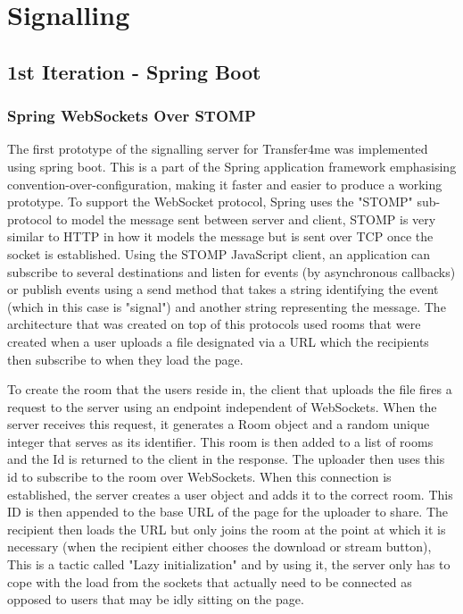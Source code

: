 \documentclass[]{report}
\begin{document}
		\section{Signalling}
			\subsection{1st Iteration - Spring Boot}
				\subsubsection*{Spring WebSockets Over STOMP}
				The first prototype of the signalling server for Transfer4me was implemented using spring boot. This is a part of the Spring application framework emphasising convention-over-configuration, making it faster and easier to produce a working prototype. To support the WebSocket protocol, Spring uses the "STOMP" sub-protocol to model the message sent between server and client, STOMP is very similar to HTTP in how it models the message but is sent over TCP once the socket is established. Using the STOMP JavaScript client, an application can subscribe to several destinations and listen for events (by asynchronous callbacks) or publish events using a send method that takes a string identifying the event (which in this case is "signal") and another string representing the message. The architecture that was created on top of this protocols used rooms that were created when a user uploads a file designated via a URL which the recipients then subscribe to when they load the page.

				To create the room that the users reside in, the client that uploads the file fires a request to the server using an endpoint independent of WebSockets. When the server receives this request, it generates a Room object and a random unique integer that serves as its identifier. This room is then added to a list of rooms and the Id is returned to the client in the response. The uploader then uses this id to subscribe to the room over WebSockets. When this connection is established, the server creates a user object and adds it to the correct room. This ID is then appended to the base URL of the page for the uploader to share. The recipient then loads the URL but only joins the room at the point at which it is necessary (when the recipient either chooses the download or stream button), This is a tactic called "Lazy initialization" and by using it, the server only has to cope with the load from the sockets that actually need to be connected as opposed to users that may be idly sitting on the page.
							
\end{document}
